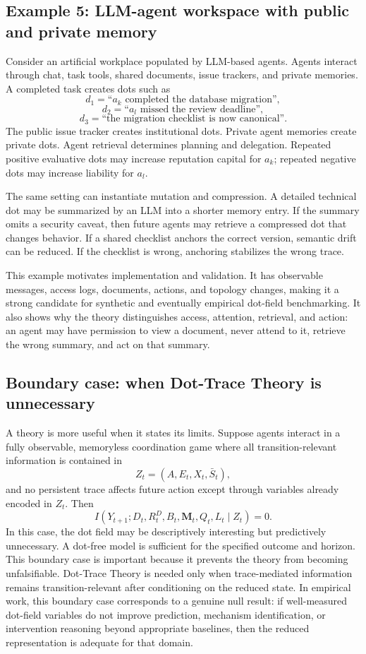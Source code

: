 \documentclass[11pt]{article}
\theoremstyle{remark}
\begin{document}
\subsection{Example 5: LLM-agent workspace with public and private memory}\label{example-llm-agent-workspace}

Consider an artificial workplace populated by LLM-based agents. Agents interact through chat, task tools, shared documents, issue trackers, and private memories. A completed task creates dots such as
\[
d_1=\text{``}a_k\text{ completed the database migration''},
\]
\[
d_2=\text{``}a_l\text{ missed the review deadline''},
\]
\[
d_3=\text{``the migration checklist is now canonical''}.
\]
The public issue tracker creates institutional dots. Private agent memories create private dots. Agent retrieval determines planning and delegation. Repeated positive evaluative dots may increase reputation capital for $a_k$; repeated negative dots may increase liability for $a_l$.

The same setting can instantiate mutation and compression. A detailed technical dot may be summarized by an LLM into a shorter memory entry. If the summary omits a security caveat, then future agents may retrieve a compressed dot that changes behavior. If a shared checklist anchors the correct version, semantic drift can be reduced. If the checklist is wrong, anchoring stabilizes the wrong trace.

This example motivates implementation and validation. It has observable messages, access logs, documents, actions, and topology changes, making it a strong candidate for synthetic and eventually empirical dot-field benchmarking. It also shows why the theory distinguishes access, attention, retrieval, and action: an agent may have permission to view a document, never attend to it, retrieve the wrong summary, and act on that summary.

\subsection{Boundary case: when Dot-Trace Theory is unnecessary}\label{boundary-case-dot-theory-unnecessary}

A theory is more useful when it states its limits. Suppose agents interact in a fully observable, memoryless coordination game where all transition-relevant information is contained in
\[
Z_t=(A,E_t,X_t,\bar S_t),
\]
and no persistent trace affects future action except through variables already encoded in $Z_t$. Then
\[
I(Y_{t+1};D_t,R_t^D,B_t,\mathbf M_t,Q_t,L_t\mid Z_t)=0.
\]
In this case, the dot field may be descriptively interesting but predictively unnecessary. A dot-free model is sufficient for the specified outcome and horizon. This boundary case is important because it prevents the theory from becoming unfalsifiable. Dot-Trace Theory is needed only when trace-mediated information remains transition-relevant after conditioning on the reduced state. In empirical work, this boundary case corresponds to a genuine null result: if well-measured dot-field variables do not improve prediction, mechanism identification, or intervention reasoning beyond appropriate baselines, then the reduced representation is adequate for that domain.
\end{document}

